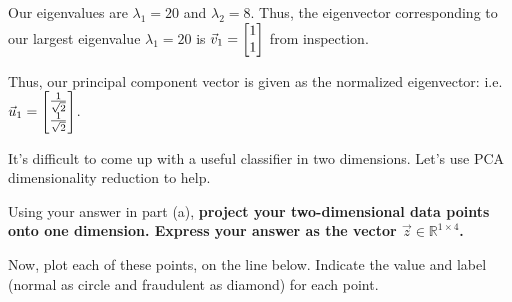 \begin{enumerate}
{			%

			

			Our eigenvalues are $\lambda_1 = 20$ and $\lambda_2 = 8$. Thus, the eigenvector corresponding to our largest eigenvalue $\lambda_1 = 20$ is $\vec{v}_1 = \begin{bmatrix}1 \\ 1\end{bmatrix}$ from inspection.
			
			Thus, our principal component vector is given as the normalized eigenvector: i.e. $\vec{u}_1 = \begin{bmatrix}\frac{1}{\sqrt{2}} \\ \frac{1}{\sqrt{2}}\end{bmatrix}$.
        }

		
		\qitem	It's difficult to come up with a useful classifier in two dimensions. Let's use PCA dimensionality reduction to help.
			
			Using your answer in part (a), \textbf{project your two-dimensional data points onto one dimension. Express your answer as the vector $\vec{z} \in \mathbb{R}^{1 \times 4}$.}

		
		
		\qitem	Now, plot each of these points, on the line below. Indicate the value and label (normal as circle and fraudulent as diamond) for each point.
			

\end{enumerate}
